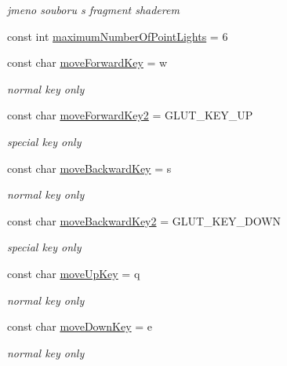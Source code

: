 \begin{DoxyCompactItemize}
\begin{DoxyCompactList}\small\item\em jmeno souboru s fragment shaderem \end{DoxyCompactList}\item 
const int \mbox{\hyperlink{namespacekrizpav6_a5de8451389cb23317a51c171c120ed5b}{maximum\+Number\+Of\+Point\+Lights}} = 6
\item 
const char \mbox{\hyperlink{namespacekrizpav6_a4044bd03f694ff2f9ecbdea75fba2aea}{move\+Forward\+Key}} = \textquotesingle{}w\textquotesingle{}
\begin{DoxyCompactList}\small\item\em normal key only \end{DoxyCompactList}\item 
const char \mbox{\hyperlink{namespacekrizpav6_ae222a923d22151701fb89a4d25a23337}{move\+Forward\+Key2}} = G\+L\+U\+T\+\_\+\+K\+E\+Y\+\_\+\+UP
\begin{DoxyCompactList}\small\item\em special key only \end{DoxyCompactList}\item 
const char \mbox{\hyperlink{namespacekrizpav6_a6e61ed596737de937f88fa1b0d618afb}{move\+Backward\+Key}} = \textquotesingle{}s\textquotesingle{}
\begin{DoxyCompactList}\small\item\em normal key only \end{DoxyCompactList}\item 
const char \mbox{\hyperlink{namespacekrizpav6_a5aeb8eabf0e13a5ba428678d299d1c70}{move\+Backward\+Key2}} = G\+L\+U\+T\+\_\+\+K\+E\+Y\+\_\+\+D\+O\+WN
\begin{DoxyCompactList}\small\item\em special key only \end{DoxyCompactList}\item 
const char \mbox{\hyperlink{namespacekrizpav6_a3936abec48cb9be3d7ea82b9cac4b4a5}{move\+Up\+Key}} = \textquotesingle{}q\textquotesingle{}
\begin{DoxyCompactList}\small\item\em normal key only \end{DoxyCompactList}\item 
const char \mbox{\hyperlink{namespacekrizpav6_a964e59a7d1b558f3b3bd0b307327272b}{move\+Down\+Key}} = \textquotesingle{}e\textquotesingle{}
\begin{DoxyCompactList}\small\item\em normal key only \end{DoxyCompactList}\item 

\end{DoxyCompactItemize}
